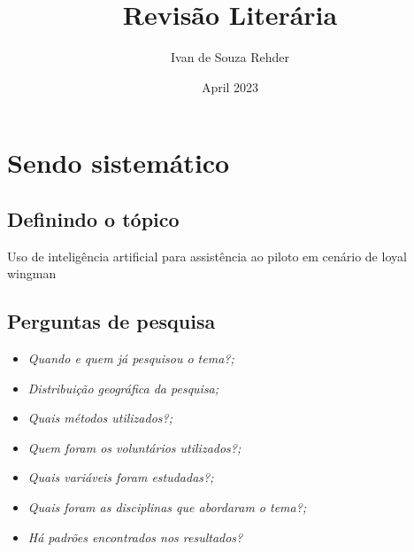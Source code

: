 \documentclass{article}
\title{Revisão Literária}
\author{Ivan de Souza Rehder}
\date{April 2023}
\begin{document}
\maketitle


\section{Sendo sistemático}

\subsection{Definindo o tópico}

Uso de inteligência artificial para assistência ao piloto em cenário de loyal wingman

\subsection{Perguntas de pesquisa}
\begin{itemize}
    \item \textit{Quando e quem já pesquisou o tema?;}
    \item \textit{Distribuição geográfica da pesquisa;}
    \item \textit{Quais métodos utilizados?;}
    \item \textit{Quem foram os voluntários utilizados?;}
    \item \textit{Quais variáveis foram estudadas?;}
    \item \textit{Quais foram as disciplinas que abordaram o tema?;}
    \item \textit{Há padrões encontrados nos resultados?} 
\end{itemize}

\end{document}
